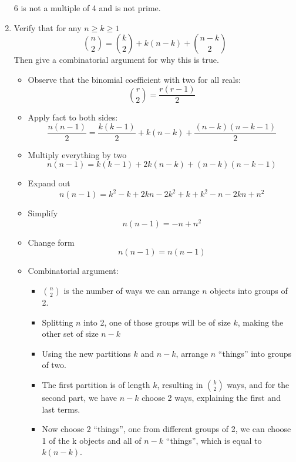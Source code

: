 \documentclass[11pt]{article}
\begin{document}
\begin{enumerate}
6 is not a multiple of 4 and is not prime.
 


\item Verify that for any $n \ge k \ge 1$
\begin{equation*}
{n \choose 2} = {k \choose 2} + k(n - k) + {n - k \choose 2}
\end{equation*}
Then give a combinatorial argument for why this is true.

\begin{itemize}
\item Observe that the binomial coefficient with two for all reals:
\begin{equation*}
{r\choose 2} = \frac{r (r - 1)}{ 2}
\end{equation*}
\item Apply fact to both sides:
\begin{equation*}
\frac{n (n - 1)}{ 2} = \frac{k (k - 1)}{ 2} + k(n - k) + \frac{(n - k) (n - k - 1)}{ 2}
\end{equation*}
\item Multiply everything by two
\begin{equation*}
n (n - 1) = k (k - 1) + 2k(n - k) + (n - k)(n - k - 1)
\end{equation*}
\item Expand out
\begin{equation*}
n (n - 1) = k^2 - k + 2kn - 2k^2 + k+k^2-n-2 k n+n^2
\end{equation*}
\item Simplify
\begin{equation*}
n (n - 1) = -n+n^2
\end{equation*}
\item Change form
\begin{equation*}
n (n - 1) = n (n - 1)
\end{equation*}

\item Combinatorial argument: 
\begin{itemize}
\item $n \choose 2$ is the number of ways we can arrange $n$ objects into groups of 2.
\item Splitting $n$ into 2, one of those groups will be of size $k$, making the other set of size $n - k$
\item Using the new partitions $k$ and $n-k$, arrange $n$ ``things'' into groups of two.
\item The first partition is of length $k$, resulting in $k\choose 2$ ways, and for the second part, we have $n-k$ choose 2 ways, explaining the first and last terms. 
\item Now choose 2 ``things'', one from different groups of 2, we can choose 1 of the k objects and all of $n-k$ ``things'', which is equal to $k(n-k)$.
\end{itemize}
\end{itemize}
\end{enumerate}
\end{document}
